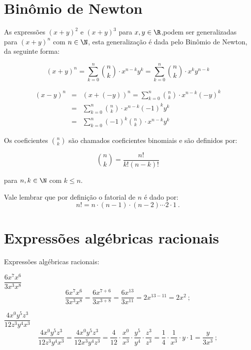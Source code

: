 \section{Binômio de Newton}
 
 As expressões $(x + y)^2$ e $(x + y)^3$ para $x, y \in \R$,podem ser generalizadas para $(x + y)^n$ com $n \in \N$, esta generalização é dada pelo Binômio de Newton, da seguinte forma:
 
\begin{equation}
(x + y)^n= \sum^{n}_{k=0} \binom{n}{k} \cdot x^{n-k} y^{k}= \sum^{n}_{k=0} \binom{n}{k} \cdot x^{k} y^{n-k} 
\end{equation}
 
\begin{eqnarray}
(x - y)^n &=& (x +(-y))^n= \sum^{n}_{k=0} \binom{n}{k} \cdot x^{n-k} (-y)^{k} \\
          &=& \sum^{n}_{k=0} \binom{n}{k} \cdot x^{n-k} (-1)^{k}y^{k} \\
          &=& \sum^{n}_{k=0} (-1)^{k} \binom{n}{k} \cdot x^{n-k} y^{k}
\end{eqnarray}
 
 Os coeficientes $\binom{n}{k}$ são chamados coeficientes binomiais e são definidos por:
 
\begin{equation}
\binom{n}{k}= \frac{n!}{k!(n-k)!}
\end{equation}

 para $n, k \in \N$ com $k \leq n$. 
 
 Vale lembrar que por definição o fatorial de $n$ é dado por:
\begin{equation}
n!= n \cdot (n-1) \cdot (n-2) \cdots 2 \cdot 1 \ .
\end{equation}

 
 \section{Expressões algébricas racionais}
 
 Expressões algébricas racionais:
 \begin{exem}    
  $\dfrac{6x^7 x^6}{3x^3x^8}$
\begin{equation}
\dfrac{6x^7 x^6}{3x^3x^8}= \dfrac{6x^{7+6}}{3x^{3+8}}= \dfrac{6x^{13}}{3x^{11}}= 2x^{13-11}= 2x^2 \ ;
\end{equation}
 \end{exem}
 
 \begin{exem}
  $\dfrac{4x^0y^5z^3}{12z^3y^4x^3}$
\begin{equation}
\dfrac{4x^0y^5z^3}{12z^3y^4x^3}= \dfrac{4x^0y^5z^3}{12x^3y^4z^3}= \dfrac{4}{12} \cdot \dfrac{x^0}{x^3} \cdot \dfrac{y^5}{y^4} \cdot \dfrac{z^3}{z^3}= \dfrac{1}{4} \cdot \dfrac{1}{x^3} \cdot y \cdot 1=\dfrac{y}{3x^3} \ ;
\end{equation}
  \end{exem}
 

